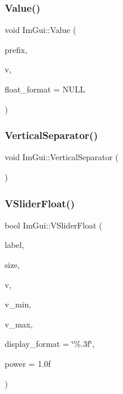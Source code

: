 \hypertarget{namespace_im_gui_a0c8b87438082a1d0a46ae2a76090ca16}{}\label{namespace_im_gui_a0c8b87438082a1d0a46ae2a76090ca16} 
\subsubsection{\texorpdfstring{Value()}{Value()}\hspace{0.1cm}{\footnotesize\ttfamily [4/4]}}
{\footnotesize\ttfamily void Im\+Gui\+::\+Value (\begin{DoxyParamCaption}\item[{const char $\ast$}]{prefix,  }\item[{float}]{v,  }\item[{const char $\ast$}]{float\+\_\+format = {\ttfamily NULL} }\end{DoxyParamCaption})}

\hypertarget{namespace_im_gui_ae60f7b8ece8808c477796e6594c8d796}{}\label{namespace_im_gui_ae60f7b8ece8808c477796e6594c8d796} 
\subsubsection{\texorpdfstring{Vertical\+Separator()}{VerticalSeparator()}}
{\footnotesize\ttfamily void Im\+Gui\+::\+Vertical\+Separator (\begin{DoxyParamCaption}{ }\end{DoxyParamCaption})}

\hypertarget{namespace_im_gui_ae629791ee70ba60199597cd1866b3735}{}\label{namespace_im_gui_ae629791ee70ba60199597cd1866b3735} 
\subsubsection{\texorpdfstring{V\+Slider\+Float()}{VSliderFloat()}}
{\footnotesize\ttfamily bool Im\+Gui\+::\+V\+Slider\+Float (\begin{DoxyParamCaption}\item[{const char $\ast$}]{label,  }\item[{const \hyperlink{struct_im_vec2}{Im\+Vec2} \&}]{size,  }\item[{float $\ast$}]{v,  }\item[{float}]{v\+\_\+min,  }\item[{float}]{v\+\_\+max,  }\item[{const char $\ast$}]{display\+\_\+format = {\ttfamily \char`\"{}\%.3f\char`\"{}},  }\item[{float}]{power = {\ttfamily 1.0f} }\end{DoxyParamCaption})}

